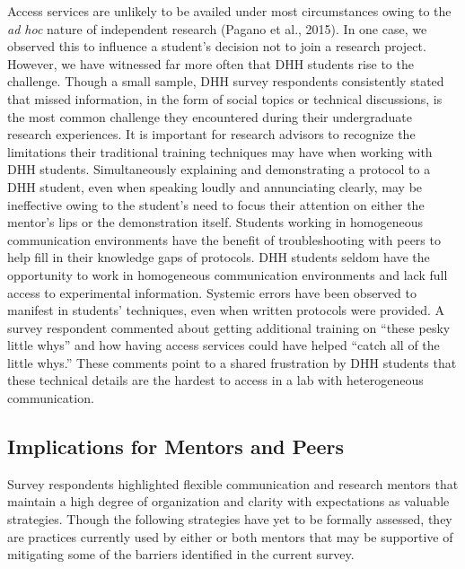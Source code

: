 \documentclass[11.5pt]{sig-alternate} %
\begin{document}
\begin{large}
Access services are unlikely to be availed under most circumstances owing to the \textit{ad hoc} nature of independent research (Pagano et al., 2015). In one case, we observed this to influence a student’s decision not to join a research project. However, we have witnessed far more often that DHH students rise to the challenge. Though a small sample, DHH survey respondents consistently stated that missed information, in the form of social topics or technical discussions, is the most common challenge they encountered during their undergraduate research experiences. It is important for research advisors to recognize the limitations their traditional training techniques may have when working with DHH students. Simultaneously explaining and demonstrating a protocol to a DHH student, even when speaking loudly and annunciating clearly, may be ineffective owing to the student’s need to focus their attention on either the mentor’s lips or the demonstration itself. Students working in homogeneous communication environments have the benefit of troubleshooting with peers to help fill in their knowledge gaps of protocols. DHH students seldom have the opportunity to work in homogeneous communication environments and lack full access to experimental information. Systemic errors have been observed to manifest in students’ techniques, even when written protocols were provided. A survey respondent commented about getting additional training on “these pesky little whys” and how having access services could have helped “catch all of the little whys.” These comments point to a shared frustration by DHH students that these technical details are the hardest to access in a lab with heterogeneous communication.

\subsection*{Implications for Mentors and Peers}

Survey respondents highlighted flexible communication and research mentors that maintain a high degree of organization and clarity with expectations as valuable strategies. Though the following strategies have yet to be formally assessed, they are practices currently used by either or both mentors that may be supportive of mitigating some of the barriers identified in the current survey. 


\end{large}
\end{document}
